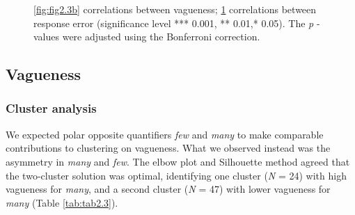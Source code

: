 \documentclass{article}
\begin{document}
\begin{figure} [H]
\begin{minipage}[b]{0.49\textwidth}
\begin{subfigure}[b]{\linewidth}
     \caption{\label{fig:fig2.3c}}
    \end{subfigure}
\end{minipage}
    \caption{\ref{fig:fig2.3b} correlations between vagueness; \ref{fig:fig2.3c} correlations between response error (significance level *** 0.001, ** 0.01,*  0.05). The \textit{p} - values were adjusted using the Bonferroni correction.}
    \label{fig:fig2.3app}
\end{figure}


\subsection{Vagueness}\label{appendix:ch3.2}
\subsubsection{Cluster analysis}
We expected polar opposite quantifiers \textit{few} and \textit{many} to make comparable contributions to clustering on vagueness. What we observed instead was the asymmetry in \textit{many} and \textit{few}. The elbow plot and Silhouette method agreed that the two-cluster solution was optimal, identifying one cluster (\textit{N} = 24) with high vagueness for \textit{many}, and a second cluster (\textit{N} = 47) with lower vagueness for \textit{many} (Table \ref{tab:tab2.3}). %

\end{document}
